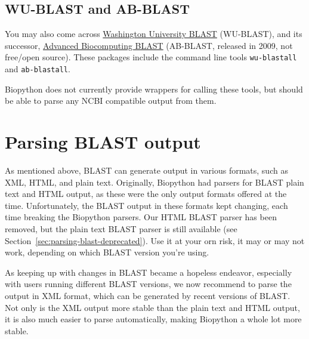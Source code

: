 \documentclass{report}
\begin{document}
\subsection{WU-BLAST and AB-BLAST}

You may also come across \href{http://blast.wustl.edu/}{Washington University BLAST}
(WU-BLAST), and its successor, \href{http://blast.advbiocomp.com}{Advanced Biocomputing
BLAST} (AB-BLAST, released in 2009, not free/open source). These packages include
the command line tools \verb|wu-blastall| and \verb|ab-blastall|.

Biopython does not currently provide wrappers for calling these tools, but should be able
to parse any NCBI compatible output from them.

\section{Parsing BLAST output}
\label{sec:parsing-blast}

As mentioned above, BLAST can generate output in various formats, such as
XML, HTML, and plain text. Originally, Biopython had parsers for BLAST
plain text and HTML output, as these were the only output formats offered
at the time. Unfortunately, the BLAST output in these formats kept changing,
each time breaking the Biopython parsers. Our HTML BLAST parser has been
removed, but the plain text BLAST parser is still available (see
Section~\ref{sec:parsing-blast-deprecated}). Use it at your orn risk,
it may or may not work, depending on which BLAST version you're using.

As keeping up with changes in BLAST
became a hopeless endeavor, especially with users running different BLAST
versions, we now recommend to parse the output in XML format, which can be
generated by recent versions of BLAST. Not only is the XML output more stable
than the plain text and HTML output, it is also much easier to parse
automatically, making Biopython a whole lot more stable.
\end{document}
